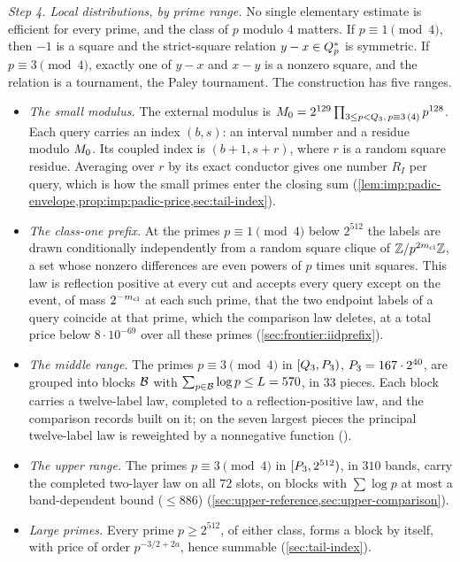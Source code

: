 \emph{Step 4. Local distributions, by prime range.}
No single elementary estimate is efficient for every prime, and the class
of $p$ modulo $4$ matters. If $p\equiv1\pmod4$, then $-1$ is a square and
the strict-square relation $y-x\in Q_{p}^{*}$ is symmetric. If $p\equiv3\pmod4$,
exactly one of $y-x$ and $x-y$ is a nonzero square, and the relation is a
tournament, the Paley tournament. The construction has five ranges.
\begin{itemize}
\item \emph{The small modulus.} The external modulus is
$M_0=2^{129}\prod_{3\le p<Q_3,\,p\equiv3\,(4)}p^{128}$.
Each query carries an index $(b,s)$: an interval number and a
residue modulo $M_0$. Its coupled index is $(b+1,s+r)$, where $r$
is a random square residue. Averaging over $r$ by its exact
conductor gives one number $R_I$ per query, which is how the small
primes enter the closing sum
(\cref{lem:imp:padic-envelope,prop:imp:padic-price,sec:tail-index}).
\item \emph{The class-one prefix.} At the primes $p\equiv1\pmod4$ below
$2^{512}$ the labels are drawn conditionally independently from a random
square clique of $\mathbb Z/p^{2m_{\mathrm{cl}}}\mathbb Z$, a set whose nonzero differences are
even powers of $p$ times unit squares. This law is reflection positive at
every cut and accepts every query except on the event, of mass
$2^{-m_{\mathrm{cl}}}$ at each such prime, that the two endpoint labels of a
query coincide at that prime,
which the comparison law deletes, at a total price below
$8\cdot10^{-69}$ over all these primes
(\cref{sec:frontier:iidprefix}).
\item \emph{The middle range.} The primes $p\equiv3\pmod4$ in
$[Q_3,P_3)$, $P_3=167\cdot2^{40}$, are grouped into blocks $\mathcal B$
with $\sum_{p\in\mathcal B}\log p\le L=570$, in $33$ pieces. Each block carries a
twelve-label law, completed to a reflection-positive law, and the
comparison records built on it; on the seven largest pieces the
principal twelve-label law is reweighted by a nonnegative function
().
\item \emph{The upper range.} The primes $p\equiv3\pmod4$ in
$[P_3,2^{512})$, in $310$ bands, carry the completed two-layer law on
all $72$ slots, on blocks with $\sum\log p$ at most a band-dependent
bound ($\le886$) (\cref{sec:upper-reference,sec:upper-comparison}).
\item \emph{Large primes.} Every prime $p\ge2^{512}$, of either
class, forms a block by itself, with price of order $p^{-3/2+2a}$,
hence summable (\cref{sec:tail-index}).
\end{itemize}
